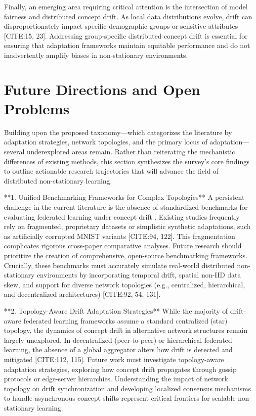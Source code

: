\documentclass[journal]{IEEEtran}
\begin{document}
Finally, an emerging area requiring critical attention is the intersection of model fairness and distributed concept drift. As local data distributions evolve, drift can disproportionately impact specific demographic groups or sensitive attributes [CITE:15, 23]. Addressing group-specific distributed concept drift is essential for ensuring that adaptation frameworks maintain equitable performance and do not inadvertently amplify biases in non-stationary environments.

\section{Future Directions and Open Problems}
\label{sec:future_directions}

Building upon the proposed taxonomy—which categorizes the literature by adaptation strategies, network topologies, and the primary locus of adaptation—several underexplored areas remain. Rather than reiterating the mechanistic differences of existing methods, this section synthesizes the survey's core findings to outline actionable research trajectories that will advance the field of distributed non-stationary learning.

**1. Unified Benchmarking Frameworks for Complex Topologies**
A persistent challenge in the current literature is the absence of standardized benchmarks for evaluating federated learning under concept drift \cite{Mahdi2025}. Existing studies frequently rely on fragmented, proprietary datasets or simplistic synthetic adaptations, such as artificially corrupted MNIST variants [CITE:94, 122]. This fragmentation complicates rigorous cross-paper comparative analyses. Future research should prioritize the creation of comprehensive, open-source benchmarking frameworks. Crucially, these benchmarks must accurately simulate real-world distributed non-stationary environments by incorporating temporal drift, spatial non-IID data skew, and support for diverse network topologies (e.g., centralized, hierarchical, and decentralized architectures) [CITE:92, 54, 131].

**2. Topology-Aware Drift Adaptation Strategies**
While the majority of drift-aware federated learning frameworks assume a standard centralized (star) topology, the dynamics of concept drift in alternative network structures remain largely unexplored. In decentralized (peer-to-peer) or hierarchical federated learning, the absence of a global aggregator alters how drift is detected and mitigated [CITE:112, 115]. Future work must investigate topology-aware adaptation strategies, exploring how concept drift propagates through gossip protocols or edge-server hierarchies. Understanding the impact of network topology on drift synchronization and developing localized consensus mechanisms to handle asynchronous concept shifts \cite{Benameur2025} represent critical frontiers for scalable non-stationary learning.
\end{document}
